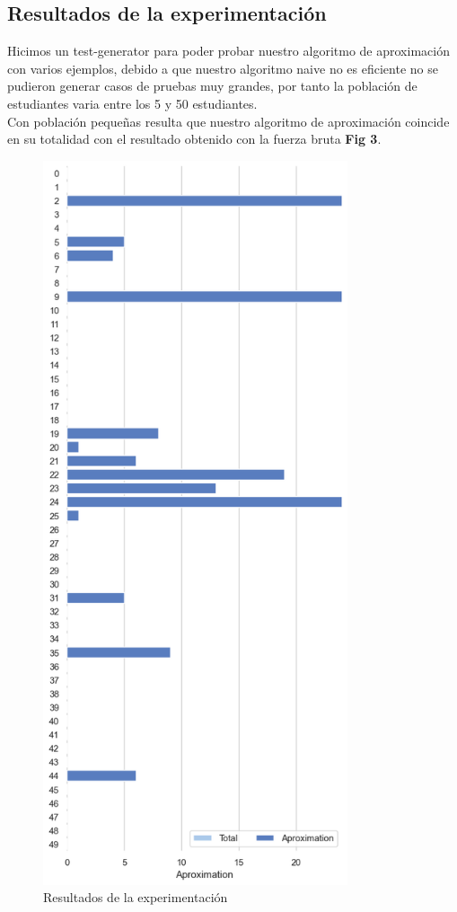 \documentclass[sn-mathphys,Numbered]{sn-jnl}%
\theoremstyle{thmstyleone}%
\theoremstyle{thmstyletwo}%
\theoremstyle{thmstylethree}%
\begin{document}
\subsection*{Resultados de la experimentaci\'on}
Hicimos un test-generator para poder probar nuestro algoritmo de aproximaci\'on con varios ejemplos, debido a que nuestro algoritmo naive no es eficiente no se pudieron generar casos de pruebas muy grandes, por tanto la poblaci\'on de estudiantes varia entre los 5 y 50 estudiantes.\\
Con poblaci\'on peque\~nas resulta que nuestro algoritmo de aproximaci\'on  coincide en su totalidad con el resultado obtenido con la fuerza bruta \textbf{Fig 3}.\\

\begin{figure}[h]
        \centering
        \includegraphics[height=0.5\textheight, width=0.8\textwidth]{Untitled.png}
        \centering
        \caption{Resultados de la experimentaci\'on}
\end{figure}
\end{document}
